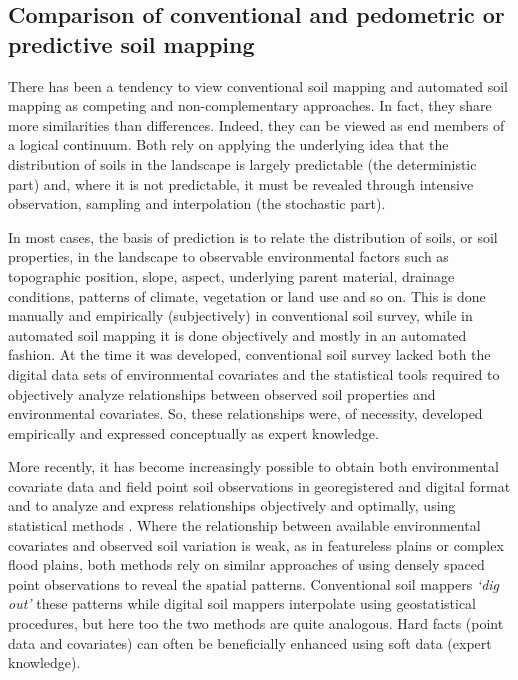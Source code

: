 \documentclass[graybox,natbib,nospthms,UStrade]{svmono}
\begin{document}
\hypertarget{comparison-conventional-pm}{%
\subsection{Comparison of conventional and pedometric or predictive soil mapping}\label{comparison-conventional-pm}}

There has been a tendency to view conventional soil mapping and
automated soil mapping as competing and non-complementary approaches. In
fact, they share more similarities than differences. Indeed, they can be
viewed as end members of a logical continuum. Both rely on applying the
underlying idea that the distribution of soils in the landscape is
largely predictable (the deterministic part) and, where it is not
predictable, it must be revealed through intensive observation, sampling
and interpolation (the stochastic part).

In most cases, the basis of prediction is to relate the distribution of
soils, or soil properties, in the landscape to observable environmental
factors such as topographic position, slope, aspect, underlying parent
material, drainage conditions, patterns of climate, vegetation or land
use and so on. This is done manually and empirically (subjectively) in
conventional soil survey, while in automated soil mapping it is done
objectively and mostly in an automated fashion. At the time it was
developed, conventional soil survey lacked both the digital data sets of
environmental covariates and the statistical tools required to
objectively analyze relationships between observed soil properties and
environmental covariates. So, these relationships were, of necessity,
developed empirically and expressed conceptually as expert knowledge.

More recently, it has become increasingly possible to obtain both
environmental covariate data and field point soil observations in
georegistered and digital format and to analyze and express
relationships objectively and optimally, using statistical methods
\citep{Pebesma2006TiG, McBratney2011HSS}. Where the relationship between
available environmental covariates and observed soil variation is weak,
as in featureless plains or complex flood plains, both methods rely on
similar approaches of using densely spaced point observations to reveal
the spatial patterns. Conventional soil mappers \emph{`dig out'} these
patterns while digital soil mappers interpolate using geostatistical
procedures, but here too the two methods are quite analogous. Hard facts
(point data and covariates) can often be beneficially enhanced using
soft data (expert knowledge).
\end{document}
